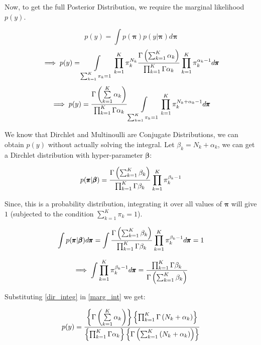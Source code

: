 \documentclass[a4paper,12pt]{article}
\begin{document}
\begin{mlsolution}
Now, to get the full Posterior Distribution, we require the marginal likelihood $p(y)$.

\begin{equation*}
    p(y) = \int p(\pmb{\pi})p(y|\pmb{\pi}) d\pmb{\pi}
\end{equation*}
\begin{equation*}
    \implies p(y) = \int\limits_{\sum_{k=1}^K \pi_k = 1} \prod\limits_{k=1}^K \pi_k^{N_k} \frac{\Gamma\left({\sum_{k=1}^K\alpha_k}\right)}{\prod_{k=1}^K \Gamma\alpha_k} \prod\limits_{k=1}^K \pi_k^{\alpha_k-1} d\pmb{\pi}
\end{equation*}
\begin{equation}\label{marg_int}
    \implies p(y) = \frac{\Gamma\left({\sum\limits_{k=1}^K\alpha_k}\right)}{\prod_{k=1}^K \Gamma\alpha_k} \int\limits_{\sum_{k=1}^K \pi_k = 1} \prod\limits_{k=1}^K \pi_k^{N_k+\alpha_k-1} d\pmb{\pi}
\end{equation}

We know that Dirchlet and Multinoulli are Conjugate Distributions, we can obtain $p(y)$ without actually solving the integral. Let $\beta_k = N_k+\alpha_k$, we can get a Dirchlet distribution with hyper-parameter $\pmb{\beta}$:

\begin{equation*}
    p(\pmb{\pi} | \pmb{\beta}) = \frac{\Gamma\left({\sum_{k=1}^K\beta_k}\right)}{\prod_{k=1}^K \Gamma\beta_k} \prod\limits_{k=1}^K \pi_k^{\beta_k-1}
\end{equation*}

Since, this is a probability distribution, integrating it over all values of $\pmb{\pi}$ will give $1$ (subjected to the condition $\sum_{k=1}^K \pi_k =1 $).

\begin{equation*}
    \int p(\pmb{\pi} | \pmb{\beta}) d\pmb{\pi} = \int \frac{\Gamma\left({\sum_{k=1}^K\beta_k}\right)}{\prod_{k=1}^K \Gamma\beta_k} \prod\limits_{k=1}^K \pi_k^{\beta_k-1} d\pmb{\pi} = 1
\end{equation*}

\begin{equation} \label{dir_integ}
    \implies \int \prod\limits_{k=1}^K \pi_k^{\beta_k-1} d\pmb{\pi} = \frac{\prod_{k=1}^K \Gamma\beta_k}{\Gamma\left({\sum_{k=1}^K\beta_k}\right)}
\end{equation}

Substituting \ref{dir_integ} in \ref{marg_int} we get:

\begin{equation} \label{fin_marg}
    p(y) = \frac{\left\{{\Gamma\left({\sum\limits_{k=1}^K\alpha_k}\right)}\right\}\left\{{\prod_{k=1}^K \Gamma\left({N_k+\alpha_k}\right)}\right\}}{\left\{{\prod_{k=1}^K \Gamma\alpha_k}\right\} \left\{{\Gamma\left({\sum_{k=1}^K\left({N_k+\alpha_k}\right)}\right)}\right\}}
\end{equation}


\end{mlsolution}
\end{document}
